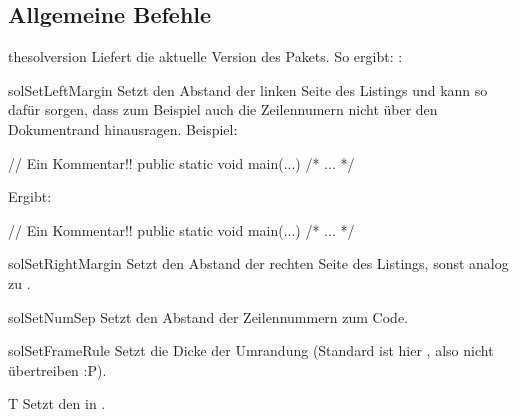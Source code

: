 \documentclass{sopra-base}
\begin{document}
\subsection{Allgemeine Befehle}

\begin{command}{thesolversion}{}
    Liefert die aktuelle Version des Pakets. So ergibt: : \thesolversion\\
\end{command}

\begin{command}{solSetLeftMargin}{}
    Setzt den Abstand der linken Seite des Listings und kann so dafür sorgen, dass zum
    Beispiel auch die Zeilennumern nicht über den Dokumentrand hinausragen. Beispiel:
\begin{latex}[morekeywords={[5]{\\solSetLeftMargin}}]
\solSetLeftMargin{15pt}
\begin{java}
// Ein Kommentar!!
public static void main(...){ /* ... */ }
\end{java}
\end{latex}
Ergibt: {
\solSetLeftMargin{15pt}
\begin{java}
// Ein Kommentar!!
public static void main(...){ /* ... */ }
\end{java}
}
\end{command}

\begin{command}{solSetRightMargin}{}
    Setzt den Abstand der rechten Seite des Listings, sonst analog zu .
\end{command}

\begin{command}{solSetNumSep}{}
    Setzt den Abstand der Zeilennummern zum Code.
\end{command}

\begin{command}{solSetFrameRule}{}
    Setzt die Dicke der Umrandung (Standard ist hier \bvoid{0.75pt}, also nicht übertreiben :P).
\end{command}

\begin{command}{T}{}
    Setzt den  in .
\end{command}
\end{document}
